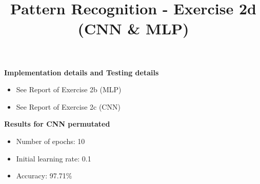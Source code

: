 \documentclass[10pt,a4paper,fullpage]{article}
\begin{document}
\title{Pattern Recognition - Exercise 2d (CNN \& MLP)}
\author{}
\predate{}
\postdate{}
\date{\vspace{-5ex}}
\maketitle


\textbf{Implementation details and Testing details}
\begin{itemize}
	\item See Report of Exercise 2b (MLP)
	\item See Report of Exercise 2c (CNN)
\end{itemize}

\textbf{Results for CNN permutated}
\begin{itemize}
	\item Number of epochs: 10
	\item Initial learning rate: 0.1
	\item Accuracy: 97.71\%
\end{itemize}
\end{document}
